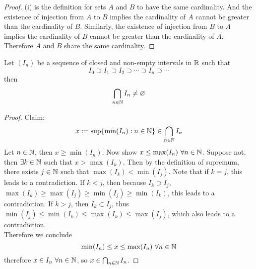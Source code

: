 \documentclass[11pt]{article}
\begin{document}
            \begin{proof}
                (i) is the definition for sets $A$ and $B$ to have the same cardinality. And the existence of injection from $A$ to $B$ implies the cardinality of $A$ cannot be greater than the cardinality of $B$. Similarly, the existence of injection from $B$ to $A$ implies the cardinality of $B$ cannot be greater than the cardinality of $A$. Therefore $A$ and $B$ share the same cardinality.
            \end{proof}
            
            \begin{theorem}
                Let $(I_n)$ be a sequence of closed and non-empty intervals in $\mathbb{R}$ such that
                \begin{equation}
                    I_0 \supset I_1 \supset I_2 \supset \cdots \supset I_n \supset \cdots
                \end{equation}
                then 
                \begin{equation}
                    \bigcap_{n \in \mathbb{N}} I_n \neq \varnothing
                \end{equation}
            \end{theorem}
            
            \begin{proof}
                Claim:
                \begin{equation}
                    x := \sup\{\min(I_n): n \in \mathbb{N}\} \in \bigcap_{n \in \mathbb{N}} I_n
                \end{equation}
                Let $n \in \mathbb{N}$, then $x \geq \min(I_n)$. Now show $x \leq \max(I_n)\ \forall n \in \mathbb{N}$. Suppose not, then $\exists k \in \mathbb{N}$ such that $x > \max(I_k)$. Then by the definition of supremum, there exists $j \in \mathbb{N}$ such that $\max(I_k) < \min(I_j)$. Note that if $k=j$, this leads to a contradiction. If $k < j$, then because $I_k\supset I_j$, $\max(I_k) \geq \max(I_j) \geq \min(I_j) \geq \min(I_k)$, this leads to a contradiction. If $k > j$, then $I_k \subset I_j$, thus $\min(I_j) \leq \min(I_k) \leq \max(I_k) \leq \max(I_j)$, which also leads to a contradiction.\\
                Therefore we conclude
                \begin{equation}
                    \min(I_n) \leq x \leq \max(I_n)\ \forall n \in \mathbb{N}
                \end{equation}
                therefore $x \in I_n\ \forall n \in \mathbb{N}$, so $x \in \bigcap_{n \in \mathbb{N}}I_n$.
            \end{proof}
            
\end{document}
